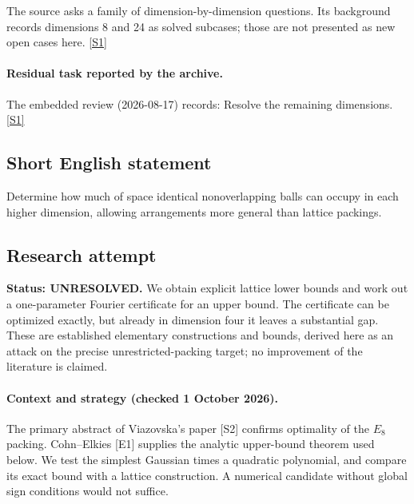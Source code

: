 \documentclass[11pt,a4paper]{article}
\newcommand{\sref}[2]{\hyperlink{source:#1:#2}{[S#2]}}
\begin{document}
The source asks a family of dimension-by-dimension questions. Its background records dimensions 8 and 24 as solved subcases; those are not presented as new open cases here. \sref{statement}{1}

\paragraph{Residual task reported by the archive.}

The embedded review (2026-08-17) records: Resolve the remaining dimensions. \sref{statement}{1}

\subsection{Short English statement}

Determine how much of space identical nonoverlapping balls can occupy in each higher dimension, allowing arrangements more general than lattice packings.

\subsection{Research attempt}
\textbf{Status: UNRESOLVED.} We obtain explicit lattice lower bounds and work out a one-parameter Fourier certificate for an upper bound. The certificate can be optimized exactly, but already in dimension four it leaves a substantial gap. These are established elementary constructions and bounds, derived here as an attack on the precise unrestricted-packing target; no improvement of the literature is claimed.

\paragraph{Context and strategy (checked 1 October 2026).}
The primary abstract of Viazovska's paper [S2] confirms optimality of the $E_8$ packing. Cohn--Elkies [E1] supplies the analytic upper-bound theorem used below. We test the simplest Gaussian times a quadratic polynomial, and compare its exact bound with a lattice construction. A numerical candidate without global sign conditions would not suffice.
\end{document}
